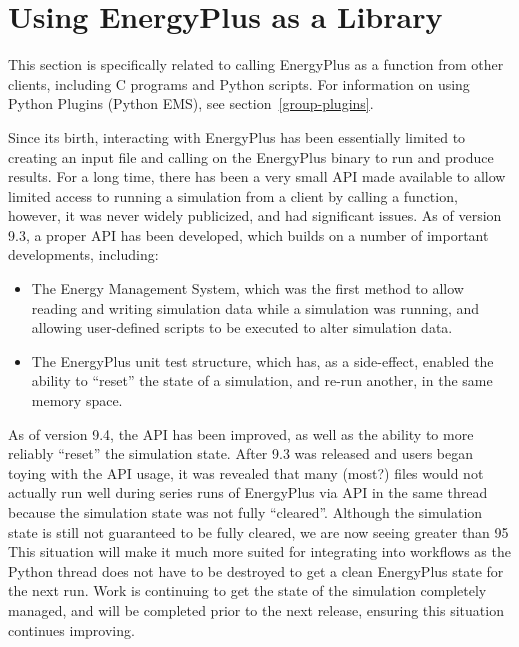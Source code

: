 
\section{Using EnergyPlus as a Library}\label{sec:api-usage}

This section is specifically related to calling EnergyPlus as a function from other clients, including C programs and Python scripts.
For information on using Python Plugins (Python EMS), see section~\ref{group-plugins}.

Since its birth, interacting with EnergyPlus has been essentially limited to creating an input file and calling on the EnergyPlus binary to run and produce results.
For a long time, there has been a very small API made available to allow limited access to running a simulation from a client by calling a function, however, it was never widely publicized, and had significant issues.
As of version 9.3, a proper API has been developed, which builds on a number of important developments, including:

\begin{itemize}
 \item The Energy Management System, which was the first method to allow reading and writing simulation data while a simulation was running, and allowing user-defined scripts to be executed to alter simulation data.
 \item The EnergyPlus unit test structure, which has, as a side-effect, enabled the ability to ``reset'' the state of a simulation, and re-run another, in the same memory space.
\end{itemize}

As of version 9.4, the API has been improved, as well as the ability to more reliably ``reset'' the simulation state.
After 9.3 was released and users began toying with the API usage, it was revealed that many (most?) files would not actually run well during series runs of EnergyPlus via API in the same thread because the simulation state was not fully ``cleared''.
Although the simulation state is still not guaranteed to be fully cleared, we are now seeing greater than 95%
This situation will make it much more suited for integrating into workflows as the Python thread does not have to be destroyed to get a clean EnergyPlus state for the next run.
Work is continuing to get the state of the simulation completely managed, and will be completed prior to the next release, ensuring this situation continues improving.

